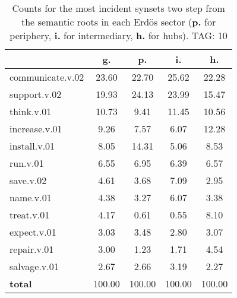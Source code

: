 \begin{table}[h!]
\begin{center}
\begin{tabular}{| l || c | c | c | c |}\hline
 & {\bf g.} & {\bf p.} & {\bf i.} & {\bf h.} \\\hline\hline
communicate.v.02 & 23.60  & 22.70  & 25.62  & 22.28 \\\hline
support.v.02 & 19.93  & 24.13  & 23.99  & 15.47 \\\hline
think.v.01 & 10.73  & 9.41  & 11.45  & 10.56 \\\hline
increase.v.01 & 9.26  & 7.57  & 6.07  & 12.28 \\\hline
install.v.01 & 8.05  & 14.31  & 5.06  & 8.53 \\\hline
run.v.01 & 6.55  & 6.95  & 6.39  & 6.57 \\\hline
save.v.02 & 4.61  & 3.68  & 7.09  & 2.95 \\\hline
name.v.01 & 4.38  & 3.27  & 6.07  & 3.38 \\\hline
treat.v.01 & 4.17  & 0.61  & 0.55  & 8.10 \\\hline
expect.v.01 & 3.03  & 3.48  & 2.80  & 3.07 \\\hline
repair.v.01 & 3.00  & 1.23  & 1.71  & 4.54 \\\hline
salvage.v.01 & 2.67  & 2.66  & 3.19  & 2.27 \\\hline\hline
{{\bf total}} & 100.00  & 100.00  & 100.00  & 100.00 \\\hline
\end{tabular}
\caption{Counts for the most incident synsets two step from the semantic roots in each Erd\"os sector ({\bf p.} for periphery, {\bf i.} for intermediary, {\bf h.} for hubs). TAG: 10}
\end{center}
\end{table}
